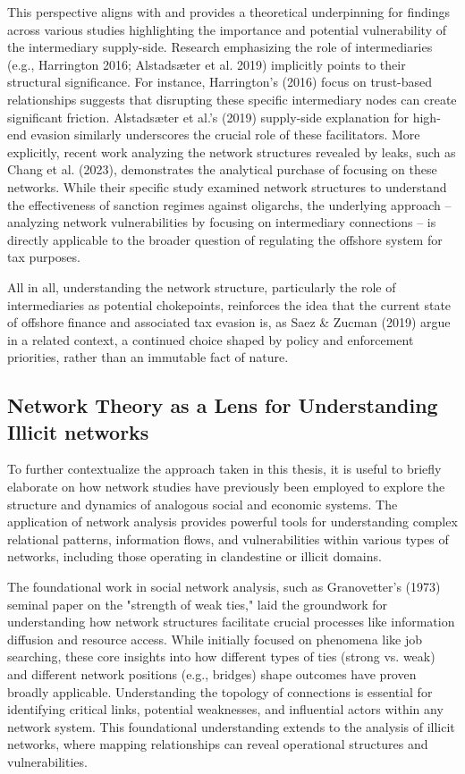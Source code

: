 This perspective aligns with and provides a theoretical underpinning for findings across various studies highlighting the importance and potential vulnerability of the intermediary supply-side. Research emphasizing the role of intermediaries (e.g., Harrington 2016; Alstadsæter et al. 2019) implicitly points to their structural significance. For instance, Harrington's (2016) focus on trust-based relationships suggests that disrupting these specific intermediary nodes can create significant friction. Alstadsæter et al.'s (2019) supply-side explanation for high-end evasion similarly underscores the crucial role of these facilitators. More explicitly, recent work analyzing the network structures revealed by leaks, such as Chang et al. (2023), demonstrates the analytical purchase of focusing on these networks. While their specific study examined network structures to understand the effectiveness of sanction regimes against oligarchs, the underlying approach – analyzing network vulnerabilities by focusing on intermediary connections – is directly applicable to the broader question of regulating the offshore system for tax purposes.

All in all, understanding the network structure, particularly the role of intermediaries as potential chokepoints, reinforces the idea that the current state of offshore finance and associated tax evasion is, as Saez \& Zucman (2019) argue in a related context, a continued choice shaped by policy and enforcement priorities, rather than an immutable fact of nature. 

\subsection{Network Theory as a Lens for Understanding Illicit networks}
\label{subsec:2_1_3}

To further contextualize the approach taken in this thesis, it is useful to briefly elaborate on how network studies have previously been employed to explore the structure and dynamics of analogous social and economic systems. The application of network analysis provides powerful tools for understanding complex relational patterns, information flows, and vulnerabilities within various types of networks, including those operating in clandestine or illicit domains.

The foundational work in social network analysis, such as Granovetter's (1973) seminal paper on the "strength of weak ties," laid the groundwork for understanding how network structures facilitate crucial processes like information diffusion and resource access. While initially focused on phenomena like job searching, these core insights into how different types of ties (strong vs. weak) and different network positions (e.g., bridges) shape outcomes have proven broadly applicable. Understanding the topology of connections is essential for identifying critical links, potential weaknesses, and influential actors within any network system. This foundational understanding extends to the analysis of illicit networks, where mapping relationships can reveal operational structures and vulnerabilities.

